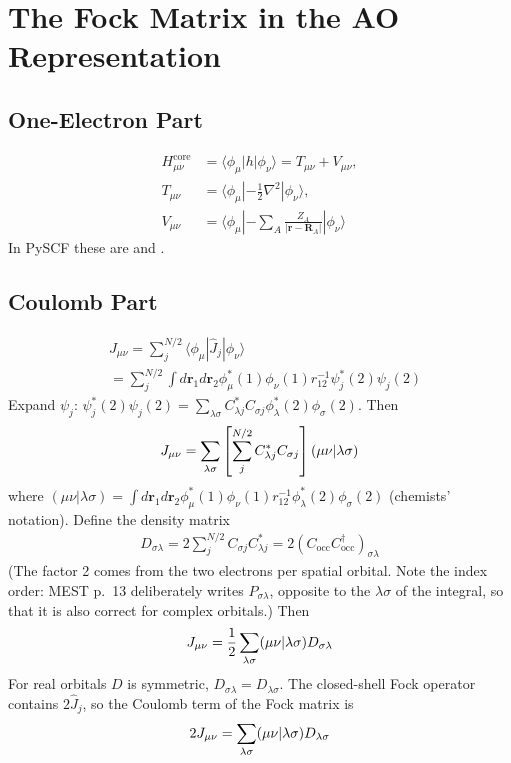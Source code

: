 \section{The Fock Matrix in the AO Representation}

\subsection{One-Electron Part}

\begin{align*}
H^{\text{core}}_{\mu \nu} &= \langle \phi_\mu|h|\phi_\nu\rangle = T_{\mu \nu} + V_{\mu \nu}, \\
T_{\mu \nu} &= \langle \phi_\mu| -\frac{1}{2} \nabla^2 |\phi_\nu\rangle, \\
V_{\mu \nu} &= \langle \phi_\mu| -\sum_A \frac{Z_A}{|\mathbf{r} - \mathbf{R}_A|} |\phi_\nu\rangle
\end{align*}
In PySCF these are  and .

\subsection{Coulomb Part}

\begin{align*}
&J_{\mu \nu} = \sum_j^{N/2} \langle \phi_\mu|\hat{J}_j|\phi_\nu\rangle \\
&= \sum_j^{N/2} \int d\mathbf{r}_1 d\mathbf{r}_2 \phi_\mu^*(1) \phi_\nu(1) r_{12}^{-1} \psi_j^*(2) \psi_j(2)
\end{align*}
Expand $\psi_j$: $\psi_j^*(2) \psi_j(2) = \sum_{\lambda \sigma} C_{\lambda j}^* C_{\sigma j} \phi_\lambda^*(2) \phi_\sigma(2)$. Then
\begin{align*}
J_{\mu \nu} = \sum_{\lambda \sigma} \left[ \sum_j^{N/2} C_{\lambda j}^* C_{\sigma j} \right] (\mu \nu\vert \lambda \sigma)
\end{align*}
where $(\mu \nu|\lambda \sigma) = \int d\mathbf{r}_1 d\mathbf{r}_2 \phi_\mu^*(1) \phi_\nu(1) r_{12}^{-1} \phi_\lambda^*(2) \phi_\sigma(2)$ (chemists' notation). Define the density matrix
\begin{align}\label{eq:density}
D_{\sigma \lambda} = 2 \sum_j^{N/2} C_{\sigma j} C_{\lambda j}^* = 2 (C_{\text{occ}} C_{\text{occ}}^\dagger)_{\sigma \lambda}
\end{align}
(The factor 2 comes from the two electrons per spatial orbital. Note the index order: MEST p.~13 deliberately writes $P_{\sigma \lambda}$, opposite to the $\lambda \sigma$ of the integral, so that it is also correct for complex orbitals.) Then
\begin{align*}
J_{\mu \nu} = \frac{1}{2} \sum_{\lambda \sigma} (\mu \nu\vert \lambda \sigma) D_{\sigma \lambda}
\end{align*}
For real orbitals $D$ is symmetric, $D_{\sigma \lambda} = D_{\lambda \sigma}$. The closed-shell Fock operator contains $2 \hat{J}_j$, so the Coulomb term of the Fock matrix is
\begin{align*}
2 J_{\mu \nu} = \sum_{\lambda \sigma} (\mu \nu\vert \lambda \sigma) D_{\lambda \sigma}
\end{align*}

